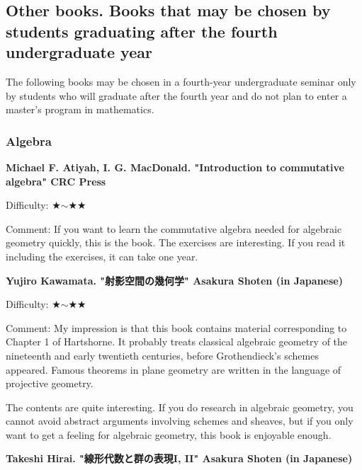 \subsection{Other books. Books that may be chosen by students graduating after the fourth undergraduate year}
\label{subsec-seminar-23}

The following books may be chosen in a fourth-year undergraduate seminar only by students who will graduate after the fourth year and do not plan to enter a master's program in mathematics.

\subsubsection{Algebra}

\textbf{Michael F. Atiyah, I. G. MacDonald. "Introduction to commutative algebra" CRC Press}  　\vspace{-6pt} 

Difficulty: ★$\sim$★★ 　\vspace{-6pt} 

Comment: If you want to learn the commutative algebra needed for algebraic geometry quickly, this is the book. The exercises are interesting.
If you read it including the exercises, it can take one year.

\vspace{8pt}

\textbf{Yujiro Kawamata. "射影空間の幾何学" Asakura Shoten (in Japanese)}  　\vspace{-6pt} 

Difficulty: ★$\sim$★★ 　\vspace{-6pt} 

Comment: My impression is that this book contains material corresponding to Chapter 1 of Hartshorne. It probably treats classical algebraic geometry of the nineteenth and early twentieth centuries, before Grothendieck's schemes appeared. Famous theorems in plane geometry are written in the language of projective geometry.

The contents are quite interesting. If you do research in algebraic geometry, you cannot avoid abstract arguments involving schemes and sheaves, but if you only want to get a feeling for algebraic geometry, this book is enjoyable enough.
\vspace{8pt}

\textbf{Takeshi Hirai. "線形代数と群の表現I, II" Asakura Shoten (in Japanese)}  　\vspace{-6pt} 

